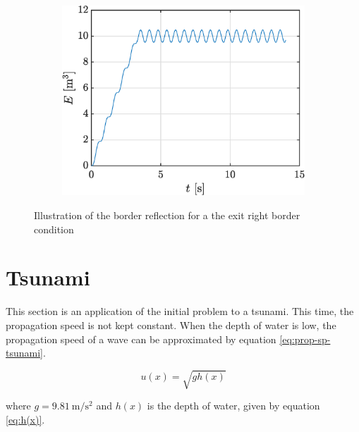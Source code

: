 \documentclass[a4paper,12pt,twoside]{article}
\newcommand{\bracket}[1]{\left(#1\right)}
\begin{document}
\begin{figure}[h!]
    \centering
    \begin{subfigure}{0.5\textwidth}
    \includegraphics[width=\textwidth]{graphs/ex1Esortie.eps}
    \end{subfigure}

    \caption{Illustration of the border reflection for a the exit right border condition}
    \label{fig:ex1sor}
    \end{figure}

    \lipsum[1-2] %

    \newpage

    \section{Tsunami}
      This section is an application of the initial problem to a tsunami.
      This time, the propagation speed is not kept constant.
      When the depth of water is low, the propagation speed of a wave can be approximated by equation \eqref{eq:prop-sp-tsunami}.

      \begin{equation}
        u\bracket{x} = \sqrt{gh\bracket{x}}
        \label{eq:prop-sp-tsunami}
      \end{equation}

      where $g=\SI{9.81}{\meter\per\square\second}$ and $h\bracket{x}$ is the depth of water, given by equation \eqref{eq:h(x)}.
\end{document}
